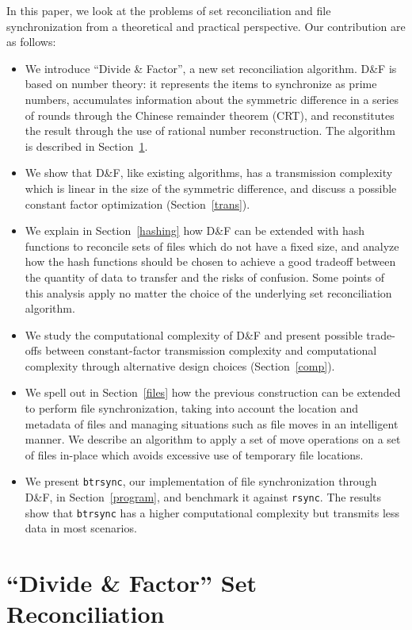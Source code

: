 \documentclass[11pt]{llncs}
\newcommand{\df}{D\&F\xspace}
\newcommand{\btrsync}{\texttt{btrsync}\xspace}
\newcommand{\rsync}{\texttt{rsync}\xspace}
\begin{document}
In this paper, we look at the problems of set reconciliation and file
synchronization from a theoretical and practical perspective. Our contribution
are as follows:
\begin{itemize}
  \item We introduce ``Divide \& Factor'', a new set reconciliation algorithm.
    \df is based on number theory: it represents the items to synchronize as
    prime numbers, accumulates information about the symmetric difference in
    a series of rounds through the Chinese remainder theorem (CRT), and reconstitutes
    the result through the use of rational number reconstruction. The algorithm
    is described in Section~\ref{dandf}.
  \item We show that \df, like existing algorithms, has a transmission
    complexity which is linear in the size of the symmetric difference, and discuss a possible constant factor optimization
    (Section~\ref{trans}).
  \item We explain in Section~\ref{hashing} how \df can be extended with hash
    functions to reconcile sets of files which do not have a fixed size, and
    analyze how the hash functions should be chosen to achieve a good tradeoff
    between the quantity of data to transfer and the risks of confusion. Some
    points of this analysis apply no matter the choice of the underlying set
    reconciliation algorithm.
  \item We study the computational complexity of \df and
    present possible trade-offs between constant-factor transmission complexity
    and computational complexity through alternative design choices
    (Section~\ref{comp}).
  \item We spell out in Section~\ref{files} how the previous construction can be
    extended to perform file synchronization, taking into account the location
    and metadata of files and managing situations such as file moves in an
    intelligent manner. We describe an algorithm to apply a set of move
    operations on a set of files in-place which avoids excessive use of
    temporary file locations.
  \item We present \btrsync, our implementation of file synchronization through
    \df, in Section~\ref{program}, and benchmark it against \rsync. The results
    show that \btrsync has a higher computational complexity but transmits less
    data in most scenarios.
\end{itemize}

\section{``Divide \& Factor'' Set Reconciliation}
\label{dandf}
\end{document}
